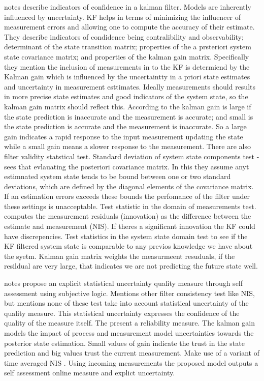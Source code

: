 \cite{gamse2014statistical} notes
describe indicators of confidence in a kalman filter. Models are inherently influenced by uncertainty. KF helps in terms of minimizing the influencer of measurement errors and allowing one to compute the accuracy of their estimate. They describe indicators of condidence being contralibility and observability; determinant of the state transition matrix; properties of the a prsteriori system state covariance matrix; and properties of the kalman gain matrix. Specifically they mention the inclusion of measurements in to the KF is determiend by the Kalman gain which is influenced by the uncertaintty in a priori state estimates and uncertainty in measurement esttimates. Ideally measurements should results in more precise state estimates and good indicators of the system state, so the kalman gain matrix should reflect this. According to  \cite{bar2001estimation} the kalman gain is large if the state prediction is inaccurate and the measurement is accurate; and small is the state prediction is accurate and the measurement is inaccurate. So a large gain indicates a rapid response to the input measurement updating the state while a small gain means a slower response to the measurement. 
There are also filter validity statstical test. Standard deviation of system state components test - sees that evlauating the posteriori covariance matrix. In this they assume anyt estimnated system state tends to be bound between one or two standard deviations, which are defined by the diagonal elements of the covariance matrix. If an estimation errors exceeds these bounds the perfomance of the filter under these settings is unacceptable. 
Test statistic in the domain of measurements test. computes the measurement residuals (innovation) as the difference between the estimate and measurement (NIS). If theres a significant innovation the KF could have discrepencies. 
Test statistics in the system state domain test to see if the KF filtered system state is comparable to any previos knowledge we have about the syetm. Kalman gain matrix weights the measurmeent resuduals, if the resildual are very large, that indicates we are not predicting the future state well. 


\cite{griebel2020kalman} notes
propose an explicit statistical uncertainty quality measure through self assessment using subjective logic. Mentions other filter consistency test like NIS, but mentions none of these test take into account statistical uncertainty of the quality measure. This statistical uncertainty expresses the confidence of the quality of the measure itself. The present a reliability measure. The kalman gain models the impact of process and measurement model uncertainties towards the posterior state estimation. Small values of gain indicate the trust in the state prediction and big values trust the current measurement. Make use of a variant of time averaged NIS \cite{bar2001estimation}. Using incoming measurements the proposed model outputs a self assessment online measure and explict uncertainty. 




